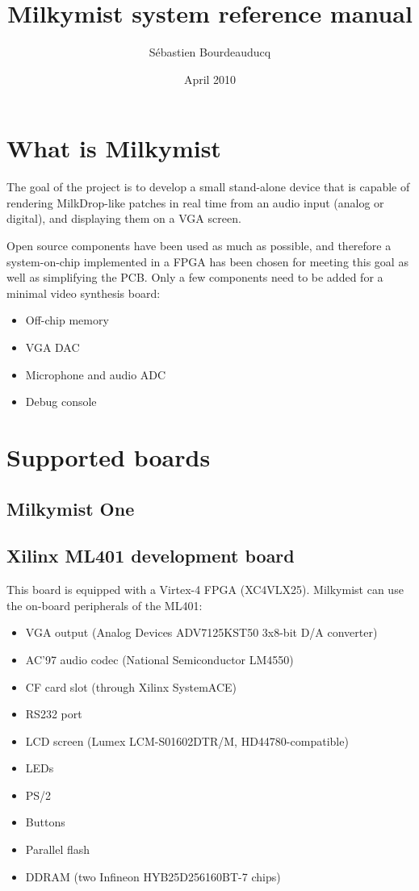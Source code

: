 \documentclass[a4paper,11pt]{article}
\title{Milkymist system reference manual}
\author{S\'ebastien Bourdeauducq}
\date{April 2010}
\begin{document}
\maketitle{}
\section{What is Milkymist}
The goal of the project is to develop a small stand-alone device that is capable of rendering MilkDrop-like patches in real time from an audio input (analog or digital), and displaying them on a VGA screen.

Open source components have been used as much as possible, and therefore a system-on-chip implemented in a FPGA has been chosen for meeting this goal as well as simplifying the PCB. Only a few components need to be added for a minimal video synthesis board:
\begin{itemize}
\item Off-chip memory
\item VGA DAC
\item Microphone and audio ADC
\item Debug console
\end{itemize}

\section{Supported boards}
\subsection{Milkymist One}

\subsection{Xilinx ML401 development board}
This board is equipped with a Virtex-4 FPGA (XC4VLX25). Milkymist can use the on-board peripherals of the ML401:
\begin{itemize}
\item VGA output (Analog Devices ADV7125KST50 3x8-bit D/A converter)
\item AC'97 audio codec (National Semiconductor LM4550)
\item CF card slot (through Xilinx SystemACE)
\item RS232 port
\item LCD screen (Lumex LCM-S01602DTR/M, HD44780-compatible)
\item LEDs
\item PS/2
\item Buttons
\item Parallel flash
\item DDRAM (two Infineon HYB25D256160BT-7 chips)
\end{itemize}
\end{document}
